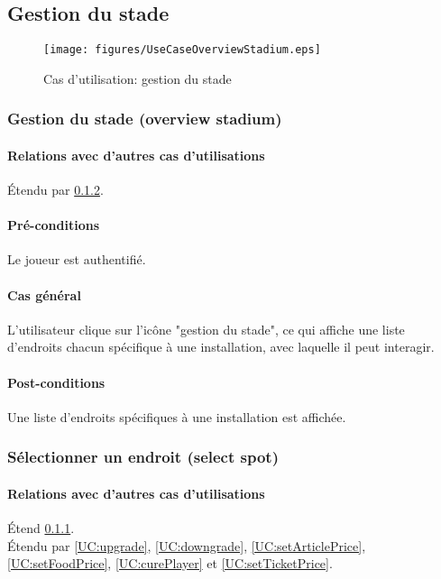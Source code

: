 
\subsection{Gestion du stade}
\begin{figure}[h]
  \centering
  \texttt{[image: figures/UseCaseOverviewStadium.eps]}
  \caption{\label{fig:UC:stadiumManagement} Cas d'utilisation: gestion du stade}
\end{figure}

\subsubsection{Gestion du stade (overview stadium)}
\label{UC:stadiumView}
\paragraph{Relations avec d'autres cas d'utilisations}
Étendu par \ref{UC:selectSpot}.
\paragraph{Pré-conditions}
\begin{list}{}{\leftmargin=1.5em}
\item{Le joueur est authentifié.}
\end{list}
\paragraph{Cas général}
L'utilisateur clique sur l'icône "gestion du stade", ce qui affiche une liste d'endroits chacun spécifique à une installation, avec laquelle il peut interagir. 
\paragraph{Post-conditions}
\begin{list}{}{\leftmargin=1.5em}
\item{Une liste d'endroits spécifiques à une installation est affichée.}
\end{list}

\subsubsection{Sélectionner un endroit (select spot)}
\label{UC:selectSpot}
\paragraph{Relations avec d'autres cas d'utilisations}
Étend \ref{UC:stadiumView}.\\
Étendu par \ref{UC:upgrade}, \ref{UC:downgrade}, \ref{UC:setArticlePrice}, \ref{UC:setFoodPrice}, \ref{UC:curePlayer} et \ref{UC:setTicketPrice}.
